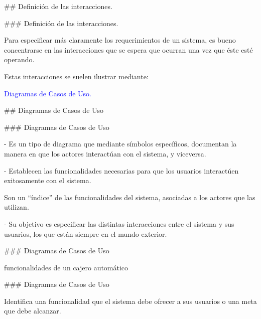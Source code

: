 ## Definición de las interacciones.

### Definición de las interacciones.

Para especificar más claramente los requerimientos de un sistema, es bueno concentrarse en
las interacciones que se espera que ocurran una vez que éste esté operando.\newline

Estas interacciones se suelen ilustrar mediante:

\begin{rboxx}{}
    \textcolor{blue}{Diagramas de Casos de Uso.}
\end{rboxx}

## Diagramas de Casos de Uso

### Diagramas de Casos de Uso

\newline

- Es un tipo de diagrama que mediante símbolos específicos, documentan la manera en que los
actores interactúan con el sistema, y viceversa.

- Establecen las funcionalidades necesarias para que los usuarios interactúen exitosamente con el sistema.

\begin{rboxx}{}
    Son un ``índice'' de las funcionalidades del sistema,
    asociadas a los actores que las utilizan.
\end{rboxx}

- Su objetivo es especificar las distintas interacciones entre el sistema y sus usuarios, los que
están siempre en el mundo exterior.

### Diagramas de Casos de Uso

 funcionalidades de un cajero automático\newline

\exA

### Diagramas de Casos de Uso

\newline

\columnsbegin


\centering{}

 Identifica una funcionalidad que el sistema
debe ofrecer a sus usuarios o una meta que debe alcanzar.\newline

